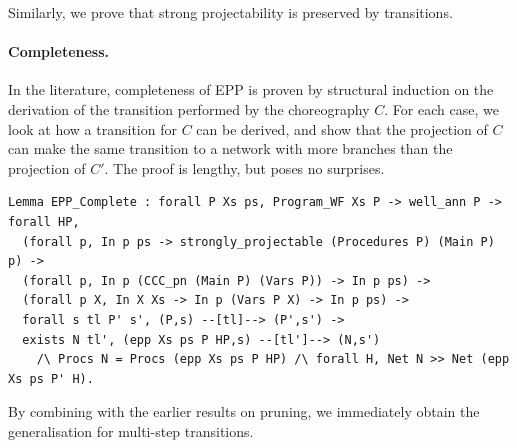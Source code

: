 \documentclass[runningheads]{llncs}
\begin{document}
Similarly, we prove that strong projectability is preserved by transitions.

\paragraph{Completeness.}
In the literature, completeness of EPP is proven by structural induction on the derivation of the transition performed by the choreography $C$.
For each case, we look at how a transition for $C$ can be derived,
and show that the projection of $C$ can make the
same transition to a network with more branches than the projection of $C'$.
The proof is lengthy, but poses no surprises.
\begin{lstlisting}
Lemma EPP_Complete : forall P Xs ps, Program_WF Xs P -> well_ann P -> forall HP,
  (forall p, In p ps -> strongly_projectable (Procedures P) (Main P) p) ->
  (forall p, In p (CCC_pn (Main P) (Vars P)) -> In p ps) ->
  (forall p X, In X Xs -> In p (Vars P X) -> In p ps) ->
  forall s tl P' s', (P,s) --[tl]--> (P',s') ->
  exists N tl', (epp Xs ps P HP,s) --[tl']--> (N,s')
    /\ Procs N = Procs (epp Xs ps P HP) /\ forall H, Net N >> Net (epp Xs ps P' H).
\end{lstlisting}
By combining with the earlier results on pruning, we immediately obtain the generalisation for
multi-step transitions.
\end{document}
